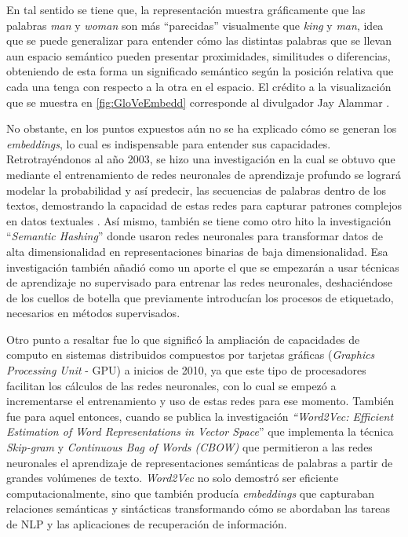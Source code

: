 \documentclass[
  12pt,
  openany]{book}
\begin{document}
En tal sentido se tiene que, la representación muestra gráficamente que las palabras \emph{man} y \emph{woman} son más ``parecidas'' visualmente que \emph{king} y \emph{man}, idea que se puede generalizar para entender cómo las distintas palabras que se llevan aun espacio semántico pueden presentar proximidades, similitudes o diferencias, obteniendo de esta forma un significado semántico según la posición relativa que cada una tenga con respecto a la otra en el espacio. El crédito a la visualización que se muestra en \ref{fig:GloVeEmbedd} corresponde al divulgador Jay Alammar \citep{wordtovec}.

No obstante, en los puntos expuestos aún no se ha explicado cómo se generan los \emph{embeddings}, lo cual es indispensable para entender sus capacidades. Retrotrayéndonos al año 2003, se hizo una investigación en la cual se obtuvo que mediante el entrenamiento de redes neuronales de aprendizaje profundo se logrará modelar la probabilidad y así predecir, las secuencias de palabras dentro de los textos, demostrando la capacidad de estas redes para capturar patrones complejos en datos textuales \citep{Bengio:2003:NPL:944919.944966} . Así mismo, también se tiene como otro hito la investigación ``\emph{Semantic Hashing}'' \citep{salakhutdinov2009} donde usaron redes neuronales para transformar datos de alta dimensionalidad en representaciones binarias de baja dimensionalidad. Esa investigación también añadió como un aporte el que se empezarán a usar técnicas de aprendizaje no supervisado para entrenar las redes neuronales, deshaciéndose de los cuellos de botella que previamente introducían los procesos de etiquetado, necesarios en métodos supervisados.

Otro punto a resaltar fue lo que significó la ampliación de capacidades de computo en sistemas distribuidos compuestos por tarjetas gráficas (\emph{Graphics Processing Unit} - GPU) a inicios de 2010, ya que este tipo de procesadores facilitan los cálculos de las redes neuronales, con lo cual se empezó a incrementarse el entrenamiento y uso de estas redes para ese momento. También fue para aquel entonces, cuando se publica la investigación \emph{``Word2Vec: Efficient Estimation of Word Representations in Vector Space}'' \citep{mikolov2013} que implementa la técnica \emph{Skip-gram} y \emph{Continuous Bag of Words (CBOW)} que permitieron a las redes neuronales el aprendizaje de representaciones semánticas de palabras a partir de grandes volúmenes de texto. \emph{Word2Vec} no solo demostró ser eficiente computacionalmente, sino que también producía \emph{embeddings} que capturaban relaciones semánticas y sintácticas transformando cómo se abordaban las tareas de NLP y las aplicaciones de recuperación de información.
\end{document}
